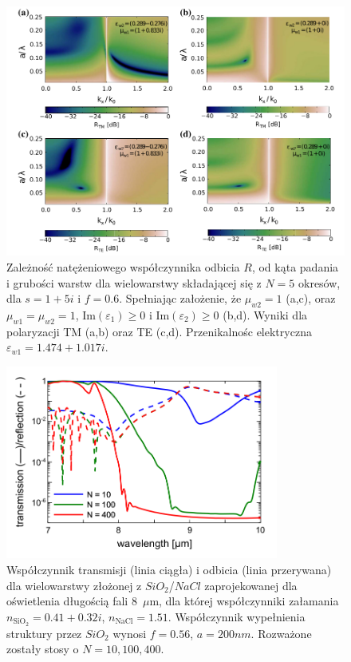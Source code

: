 \begin{figure}[tb]
	\includegraphics[width=\textwidth]{images/pml/fig5.png}
	\caption{Zależność natężeniowego współczynnika odbicia $R$, od kąta padania i grubości warstw dla wielowarstwy składającej się z $N=5$ okresów, dla $s=1+5i$ i $f=0.6$. Spełniając założenie, że $\mu_{w2}=1$ (a,c), oraz $\mu_{w1}=\mu_{w2}=1$, $\textrm{Im}(\varepsilon_1)\ge 0 $ i $\textrm{Im}(\varepsilon_2)\ge 0 $ (b,d). Wyniki dla polaryzacji TM (a,b) oraz TE (c,d). Przenikalnośc elektryczna $\varepsilon_{w1}=1.474+1.017i$.}
	\label{fig:pml-real-ref}
\end{figure}

\begin{figure}[tb]
	\centering
	\includegraphics[width=0.8\textwidth]{images/pml/oqe_trans_refl.png}
	\caption{Współczynnik transmisji (linia ciągła) i odbicia (linia przerywana) dla wielowarstwy złożonej z $SiO_2$/$NaCl$ zaprojekowanej dla oświetlenia długością fali 8~$\mu$m, dla której współczynniki załamania $n_{\textrm{SiO}_2}=0.41+0.32i$, $n_{\textrm{NaCl}}=1.51$. Współczynnik wypełnienia struktury przez $SiO_2$ wynosi $f=0.56$, $a=200nm$. Rozważone zostały stosy o $N=10,100,400$.}
	\label{fig:oqe-trans-refl}
\end{figure}

